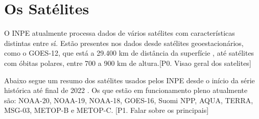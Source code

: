 \documentclass[cic,tc]{iiufrgs}
\begin{document}
\section{Os Satélites}

O INPE atualmente processa dados de vários satélites com características distintas entre sí. Estão presentes nos dados desde satélites geoestacionários, como o GOES-12, que está a 29.400 km de distância da superfície \citep{GOES12Algo}, até satélites com óbitas polares, entre 700 a 900 km de altura.[P0. Visao geral dos satelites] \par

Abaixo segue um resumo dos satélites usados pelos INPE desde o início da série histórica até final de 2022 \cite{EmbrapaSatelites}. Os que estão em funcionamento pleno atualmente são: NOAA-20, NOAA-19, NOAA-18, GOES-16, Suomi NPP, AQUA, TERRA, MSG-03, METOP-B e METOP-C. [P1. Falar sobre os principais]\par
\end{document}
